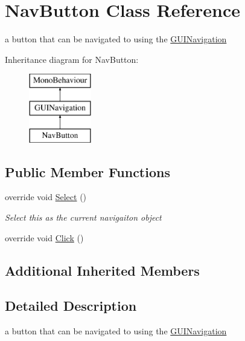 \hypertarget{class_nav_button}{}\section{Nav\+Button Class Reference}
\label{class_nav_button}


a button that can be navigated to using the \mbox{\hyperlink{class_g_u_i_navigation}{G\+U\+I\+Navigation}}  


Inheritance diagram for Nav\+Button\+:\begin{figure}[H]
\begin{center}
\leavevmode
\includegraphics[height=3.000000cm]{class_nav_button}
\end{center}
\end{figure}
\subsection*{Public Member Functions}
\begin{DoxyCompactItemize}
\item 
override void \mbox{\hyperlink{class_nav_button_ac6d38f6d6b51c27c7b6a67d9efcfcb8e}{Select}} ()
\begin{DoxyCompactList}\small\item\em Select this as the current navigaiton object \end{DoxyCompactList}\item 
override void \mbox{\hyperlink{class_nav_button_ac574ba6c7acafe3ccd18b2c62b8c261d}{Click}} ()
\end{DoxyCompactItemize}
\subsection*{Additional Inherited Members}


\subsection{Detailed Description}
a button that can be navigated to using the \mbox{\hyperlink{class_g_u_i_navigation}{G\+U\+I\+Navigation}} 



